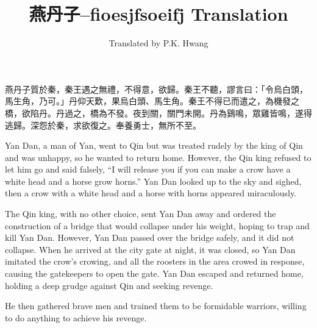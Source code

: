 \documentclass[12pt]{book}
\begin{document}
\title{燕丹子--fioesjfsoeifj Translation}
\date{}
\author{Translated by P.K. Hwang}

\maketitle\begin{pairs}
\begin{Rightside}
\begin{chinese}
\beginnumbering
\pstart
燕丹子質於秦，秦王遇之無禮，不得意，欲歸。秦王不聽，謬言曰：「令烏白頭，馬生角，乃可。」丹仰天歎，果烏白頭、馬生角。秦王不得已而遣之，為機發之橋，欲陷丹。丹過之，橋為不發。夜到關，關門未開。丹為鷄鳴，眾雞皆鳴，遂得逃歸。深怨於秦，求欲復之。奉養勇士，無所不至。
\pend
\endnumbering
\end{chinese}
\end{Rightside}
\begin{Leftside}
\begin{fioesjfsoeifj}
\beginnumbering
\pstart
Yan Dan, a man of Yan, went to Qin but was treated rudely by the king of Qin and was unhappy, so he wanted to return home. However, the Qin king refused to let him go and said falsely, ``I will release you if you can make a crow have a white head and a horse grow horns.'' Yan Dan looked up to the sky and sighed, then a crow with a white head and a horse with horns appeared miraculously.

The Qin king, with no other choice, sent Yan Dan away and ordered the construction of a bridge that would collapse under his weight, hoping to trap and kill Yan Dan. However, Yan Dan passed over the bridge safely, and it did not collapse. When he arrived at the city gate at night, it was closed, so Yan Dan imitated the crow's crowing, and all the roosters in the area crowed in response, causing the gatekeepers to open the gate. Yan Dan escaped and returned home, holding a deep grudge against Qin and seeking revenge.

He then gathered brave men and trained them to be formidable warriors, willing to do anything to achieve his revenge.
\pend
\endnumbering
\end{fioesjfsoeifj}
\end{Leftside}
\end{pairs}
\Columns
\end{document}
